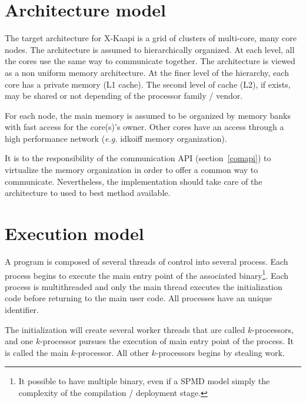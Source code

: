 \documentclass{report}
\begin{document}
\section{Architecture model}

The target architecture for X-Kaapi is a grid of clusters of multi-core, many core nodes.
The architecture is assumed to hierarchically organized. At each level, all the cores use the same way to communicate together. The architecture is viewed as a non uniform memory architecture.
At the finer level of the hierarchy, each core has a private memory (L1 cache). The second level of cache  (L2), if exists, may be shared or not depending of the processor family / vendor. 

For each node, the main memory is assumed to be organized by memory banks with fast access for the core(s)'s owner. Other cores have an access through a high performance network (\textit{e.g.} idkoiff memory organization).

It is to the responsibility of the communication API (section~\ref{comapi}) to virtualize the memory organization in order to offer a common way to communicate. Nevertheless, the implementation should take care of the architecture to used to best method available.

\section{Execution model}
A program is composed of several threads of control into several process. 
Each process begins to execute the main entry point of the associated binary\footnote{It possible to have multiple binary, even if a SPMD model simply the complexity of the compilation / deployment stage.}. Each process is multithreaded and only the main thread  executes the initialization code before returning to the main user code. All processes have an unique identifier.

The initialization will create several worker threads that are called $k$-processors, and one $k$-processor pursues  the execution of main entry point of the process. It is called the main $k$-processor. All other $k$-processors begins by stealing work.
\end{document}

